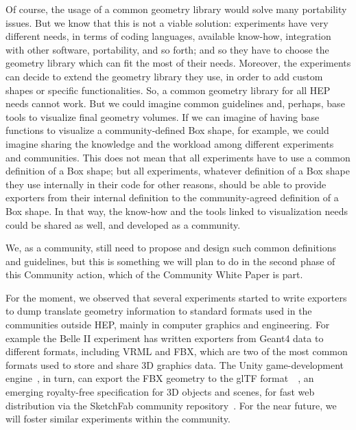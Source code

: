 \documentclass[12pt,a4paper]{article}
\begin{document}
Of course, the usage of a common geometry library would solve many portability issues. But we know that this is not a viable
solution: experiments have very different needs, in terms of coding languages, available know-how, integration with other
software, portability, and so forth; and so they have to choose the geometry library which can fit the most of their needs.
Moreover, the experiments can decide to extend the geometry library they use, in order to add custom shapes or specific functionalities.
So, a common geometry library for all HEP needs cannot work.
But we could imagine common guidelines and, perhaps, base tools to visualize final geometry volumes. If we can imagine of
having base functions to visualize a community-defined Box shape, for example, we could imagine sharing the knowledge and the
workload among different experiments and communities. This does not mean that all experiments have to use a common definition
of a Box shape; but all experiments, whatever definition of a Box shape they use internally in their code for other reasons,
should be able to provide exporters from their internal definition to the community-agreed definition of a Box shape.
In that way, the know-how and the tools linked to visualization needs could be shared as well, and developed as a community.

We, as a community, still need to propose and design such common definitions and guidelines, but this is something we will
plan to do in the second phase of this Community action, which of the Community White Paper is part.

For the moment, we observed that several experiments started to write exporters to dump translate geometry information to
standard formats used in the communities outside HEP, mainly in computer graphics and engineering. For example the Belle II
experiment has written exporters from Geant4 data to different formats, including VRML and FBX, which are two of the most common
formats used to store and share 3D graphics data. The Unity game-development engine~\cite{Unity3D}, in turn, can export the
FBX geometry to the glTF format~\cite{glTF}~\cite{SketchFabBelleII}, an emerging royalty-free specification for 3D objects and scenes,
for fast web distribution via the SketchFab community repository~\cite{SketchFab}. For the near future, we will foster similar
experiments within the community.
\end{document}
